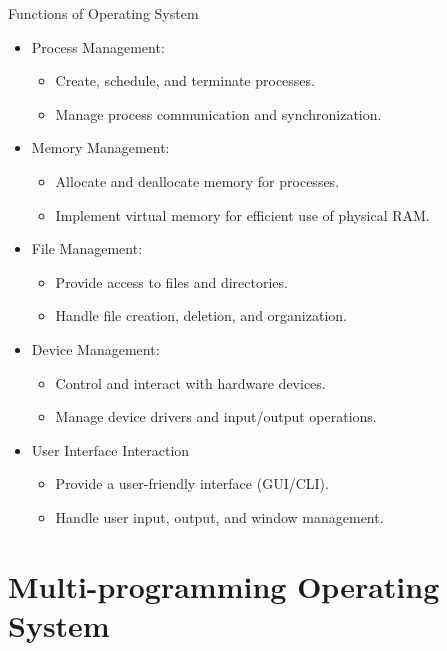\documentclass{beamer}
\begin{document}
\begin{frame}{Functions of Operating System}
\begin{itemize}
\item Process Management:
	\begin{itemize}
	\item Create, schedule, and terminate processes.
	\item Manage process communication and synchronization.
	\end{itemize}
\item Memory Management:
	\begin{itemize}
	\item Allocate and deallocate memory for processes.
	\item Implement virtual memory for efficient use of physical RAM.
	\end{itemize}
\item File Management:
	\begin{itemize}
	\item Provide access to files and directories.
	\item Handle file creation, deletion, and organization.
	\end{itemize}
\item Device Management:
	\begin{itemize}
	\item Control and interact with hardware devices.
	\item Manage device drivers and input/output operations.
	\end{itemize}
\item User Interface Interaction
	\begin{itemize}
	\item Provide a user-friendly interface (GUI/CLI).
	\item Handle user input, output, and window management.
	\end{itemize}
\end{itemize}
\end{frame}

\section{Multi-programming Operating System}
\end{document}
